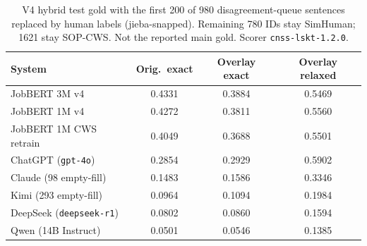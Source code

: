 \begin{table}[t]
\centering
\small
\caption{V4 hybrid test gold with the first 200 of 980 disagreement-queue sentences replaced by human labels (jieba-snapped). Remaining 780 IDs stay SimHuman; 1621 stay SOP-CWS. Not the reported main gold. Scorer \texttt{cnss-lskt-1.2.0}.}
\label{tab:hybrid-human200-overlay}
\begin{tabular}{lccc}
\toprule
System & Orig.\ exact & Overlay exact & Overlay relaxed \\
\midrule
JobBERT 3M v4 & 0.4331 & 0.3884 & 0.5469 \\
JobBERT 1M v4 & 0.4272 & 0.3811 & 0.5560 \\
JobBERT 1M CWS retrain & 0.4049 & 0.3688 & 0.5501 \\
ChatGPT (\texttt{gpt-4o}) & 0.2854 & 0.2929 & 0.5902 \\
Claude (98 empty-fill) & 0.1483 & 0.1586 & 0.3346 \\
Kimi (293 empty-fill) & 0.0964 & 0.1094 & 0.1984 \\
DeepSeek (\texttt{deepseek-r1}) & 0.0802 & 0.0860 & 0.1594 \\
Qwen (14B Instruct) & 0.0501 & 0.0546 & 0.1385 \\
\bottomrule
\end{tabular}
\end{table}
